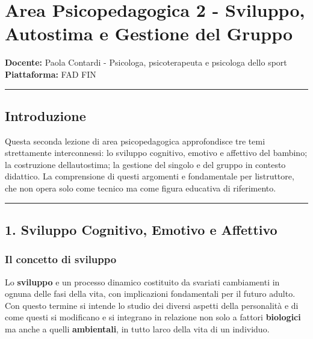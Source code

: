 \documentclass[a4paper,11pt]{article}
\begin{document}
\section{Area Psicopedagogica 2 - Sviluppo, Autostima e Gestione del
  Gruppo}\label{area-psicopedagogica-2---sviluppo-autostima-e-gestione-del-gruppo}

\textbf{Docente:} Paola Contardi - Psicologa, psicoterapeuta e psicologa
dello sport\\
\textbf{Piattaforma:} FAD FIN

\begin{center}\rule{0.5\linewidth}{0.5pt}\end{center}

\subsection{Introduzione}\label{introduzione-5}

Questa seconda lezione di area psicopedagogica approfondisce tre temi
strettamente interconnessi: lo sviluppo cognitivo, emotivo e affettivo
del bambino; la costruzione dell\textquotesingle autostima; la gestione
del singolo e del gruppo in contesto didattico. La comprensione di
questi argomenti e fondamentale per l\textquotesingle istruttore, che
non opera solo come tecnico ma come figura educativa di riferimento.

\begin{center}\rule{0.5\linewidth}{0.5pt}\end{center}

\subsection{1. Sviluppo Cognitivo, Emotivo e
      Affettivo}\label{sviluppo-cognitivo-emotivo-e-affettivo}

\subsubsection{Il concetto di sviluppo}\label{il-concetto-di-sviluppo}

Lo \textbf{sviluppo} e un processo dinamico costituito da svariati
cambiamenti in ognuna delle fasi della vita, con implicazioni
fondamentali per il futuro adulto. Con questo termine si intende lo
studio dei diversi aspetti della personalità e di come questi si
modificano e si integrano in relazione non solo a fattori
\textbf{biologici} ma anche a quelli \textbf{ambientali}, in tutto
l\textquotesingle arco della vita di un individuo.
\end{document}
